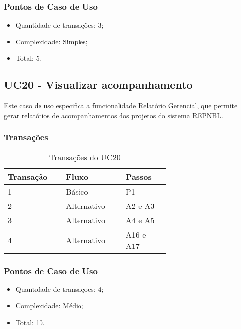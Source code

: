   \subsubsection{Pontos de Caso de Uso}

  \begin{itemize}
  \item Quantidade de transações: 3;
  \item Complexidade: Simples;
  \item Total: 5.
  \end{itemize}
   
  \vfill
  
  
  
  
\pagebreak
\subsection{UC20 - Visualizar acompanhamento}
  
  Este caso de uso especifica a funcionalidade Relatório Gerencial, que permite gerar 
  relatórios de acompanhamentos dos projetos do sistema REPNBL.
  
  \subsubsection{Transações}

  \begin{table*}[!h]
  \centering
  \caption{Transações do UC20}
  \label{uc20_transactions}
    \begin{tabular}{|p{0.20\linewidth}|p{0.25\linewidth}|p{0.20\linewidth}|}
    \hline
    \textbf{Transação} & \textbf{Fluxo} & \textbf{Passos} \\ 
    \hline
    1 & Básico & P1\\
    \hline
    2 & Alternativo & A2 e A3 \\
    \hline
    3 & Alternativo & A4 e A5 \\
    \hline
    4 & Alternativo & A16 e A17\\
    \hline
    \end{tabular}
  \end{table*}

  \subsubsection{Pontos de Caso de Uso}

  \begin{itemize}
  \item Quantidade de transações: 4;
  \item Complexidade: Médio;
  \item Total: 10.
  \end{itemize}
  
